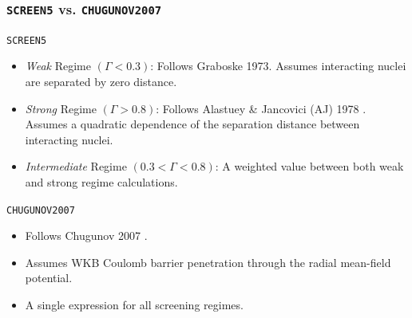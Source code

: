 \documentclass[
	11pt, %
]{beamer}
\begin{document}
\begin{frame}
\frametitle{{\tt SCREEN5} vs. {\tt CHUGUNOV2007}}

    \begin{block}{\tt SCREEN5}
        \begin{itemize}
            \item {\it Weak} Regime $(\Gamma < 0.3)$: Follows Graboske 1973\cite{Graboske_1973}. Assumes interacting nuclei are separated by zero distance.
            \item {\it Strong} Regime $(\Gamma > 0.8)$: Follows Alastuey \& Jancovici (AJ) 1978 \cite{Alastuey_Jancovici:1978}. Assumes a quadratic dependence of the separation distance between interacting nuclei.
            \item {\it Intermediate} Regime $(0.3 < \Gamma < 0.8)$: A weighted value between both weak and strong regime calculations.
        \end{itemize}
    \end{block}

    \begin{block}{\tt CHUGUNOV2007}
        \begin{itemize}
            \item Follows Chugunov 2007 \cite{Chugunov_2007}.
            \item Assumes WKB Coulomb barrier penetration through the radial mean-field potential.
            \item A single expression for all screening regimes.
        \end{itemize}
    \end{block}
\end{frame}
\end{document}
